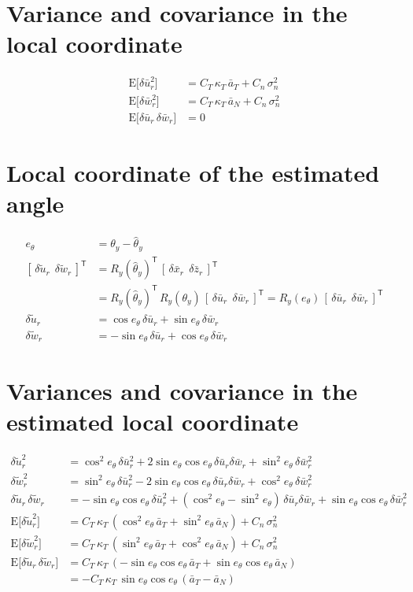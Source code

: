 \documentclass[11pt,a4paper]{ctexart}
\newcommand{\setline}[1]{\noindent{\small\textcolor[gray]{0.35}{#1}}\par\smallskip}
\newcommand{\ba}{\bar{a}}
\newcommand{\bx}{\bar{x}}
\newcommand{\bz}{\bar{z}}
\newcommand{\bu}{\bar{u}}
\newcommand{\bw}{\bar{w}}
\newcommand{\tu}{\tilde{u}}
\newcommand{\tw}{\tilde{w}}
\newcommand{\thy}{\theta_y}
\newcommand{\hth}{\hat\theta_y}
\newcommand{\CK}{C_T\,\kappa_T}
\newcommand{\Cn}{C_n\,\sigma_n^2}
\newcommand{\E}{\mathrm{E}}
\begin{document}
\section{Variance and covariance in the local coordinate}
\setline{assumption: the random components along the wall and along the surface normal are uncorrelated}
\begin{align*}
\E\big[\delta\bu_r^2\big] &= \CK\,\ba_T + \Cn \\
\E\big[\delta\bw_r^2\big] &= \CK\,\ba_N + \Cn \\
\E\big[\delta\bu_r\,\delta\bw_r\big] &= 0
\end{align*}

\section{Local coordinate of the estimated angle}
\setline{the estimator uses $\hth$; the wall is at $\thy$}
\begin{align*}
e_\theta &= \thy - \hth \\
[\,\delta\tu_r\ \ \delta\tw_r\,]^{\mathsf T} &= R_y(\hth)^{\mathsf T}\,[\,\delta\bx_r\ \ \delta\bz_r\,]^{\mathsf T} \\
&= R_y(\hth)^{\mathsf T}\,R_y(\thy)\,[\,\delta\bu_r\ \ \delta\bw_r\,]^{\mathsf T} = R_y(e_\theta)\,[\,\delta\bu_r\ \ \delta\bw_r\,]^{\mathsf T} \\
\delta\tu_r &= \cos e_\theta\,\delta\bu_r + \sin e_\theta\,\delta\bw_r \\
\delta\tw_r &= -\sin e_\theta\,\delta\bu_r + \cos e_\theta\,\delta\bw_r
\end{align*}

\section{Variances and covariance in the estimated local coordinate}
\begin{align*}
\delta\tu_r^2 &= \cos^2 e_\theta\,\delta\bu_r^2 + 2\sin e_\theta\cos e_\theta\,\delta\bu_r\delta\bw_r + \sin^2 e_\theta\,\delta\bw_r^2 \\
\delta\tw_r^2 &= \sin^2 e_\theta\,\delta\bu_r^2 - 2\sin e_\theta\cos e_\theta\,\delta\bu_r\delta\bw_r + \cos^2 e_\theta\,\delta\bw_r^2 \\
\delta\tu_r\,\delta\tw_r &= -\sin e_\theta\cos e_\theta\,\delta\bu_r^2 + (\cos^2 e_\theta - \sin^2 e_\theta)\,\delta\bu_r\delta\bw_r + \sin e_\theta\cos e_\theta\,\delta\bw_r^2 \\[6pt]
\E\big[\delta\tu_r^2\big] &= \CK\,(\cos^2 e_\theta\,\ba_T + \sin^2 e_\theta\,\ba_N) + \Cn \\
\E\big[\delta\tw_r^2\big] &= \CK\,(\sin^2 e_\theta\,\ba_T + \cos^2 e_\theta\,\ba_N) + \Cn \\
\E\big[\delta\tu_r\,\delta\tw_r\big] &= \CK\,(-\sin e_\theta\cos e_\theta\,\ba_T + \sin e_\theta\cos e_\theta\,\ba_N) \\
&= -\CK\,\sin e_\theta\cos e_\theta\,(\ba_T - \ba_N)
\end{align*}
\end{document}
